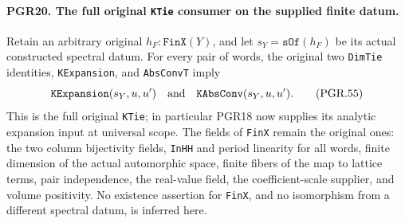 \paragraph{PGR20. The full original \texttt{KTie} consumer on the supplied finite datum.}
\label{claim:PGR20}
Retain an arbitrary original \(h_F:\texttt{FinX}(Y)\), and let
\(s_Y=\texttt{sOf}(h_F)\) be its actual constructed spectral
datum.  For every pair of words, the original two
\texttt{DimTie} identities, \texttt{KExpansion}, and
\texttt{AbsConvT} imply
\[
     \texttt{KExpansion}(s_Y,u,u')
                     \quad\hbox{and}\quad
     \texttt{KAbsConv}(s_Y,u,u').
\tag{PGR.55}
\]
This is the full original \texttt{KTie}; in particular PGR18
now supplies its analytic expansion input at universal scope.
The fields of \texttt{FinX} remain the original ones: the two
column bijectivity fields, \texttt{InHH} and period linearity
for all words, finite dimension of the actual automorphic space,
finite fibers of the map to lattice terms, pair independence,
the real-value field, the coefficient-scale supplier, and volume
positivity.  No existence assertion for \texttt{FinX}, and no
isomorphism from a different spectral datum, is inferred here.
